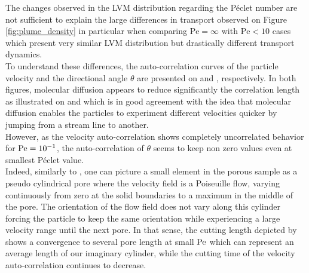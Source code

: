 The changes observed in the LVM distribution regarding the Péclet number are not sufficient to explain the large differences in transport observed on Figure \ref{fig:plume_density} in particular when comparing $\mathrm{Pe}=\infty$ with $\mathrm{Pe}<10$ cases which present very similar LVM distribution but drastically different transport dynamics.\\
To understand these differences, the auto-correlation curves of the particle velocity and the directional angle $\theta$ are presented on  and , respectively.
In both figures, molecular diffusion appears to reduce significantly the correlation length as illustrated on  and  which is in good agreement with the idea that molecular diffusion enables the particles to experiment different velocities quicker by jumping from a stream line to another.\\
However, as the velocity auto-correlation shows completely uncorrelated behavior for $\mathrm{Pe}=10^{-1}$, the auto-correlation of $\theta$ seems to keep non zero values even at smallest Péclet value.\\
Indeed, similarly to \citet{Dentz2017}, one can picture a small element in the porous sample as a pseudo cylindrical pore where the velocity field is a Poiseuille flow, varying continuously from zero at the solid boundaries to a maximum in the middle of the pore.
The orientation of the flow field does not vary along this cylinder forcing the particle to keep the same orientation while experiencing a large velocity range until the next pore.
In that sense, the cutting length depicted by  shows a convergence to several pore length at small $\mathrm{Pe}$ which can represent an average length of our imaginary cylinder, while the cutting time of the velocity auto-correlation continues to decrease.


